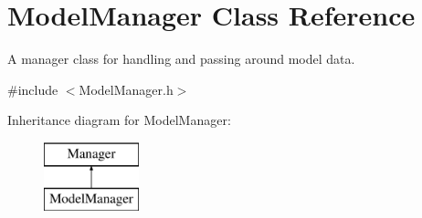 \hypertarget{class_model_manager}{}\section{Model\+Manager Class Reference}
\label{class_model_manager}


A manager class for handling and passing around model data.  




{\ttfamily \#include $<$Model\+Manager.\+h$>$}

Inheritance diagram for Model\+Manager\+:\begin{figure}[H]
\begin{center}
\leavevmode
\includegraphics[height=2.000000cm]{class_model_manager}
\end{center}
\end{figure}

